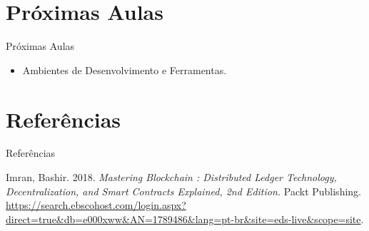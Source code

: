 \documentclass[
  pt-BR,
  ignorenonframetext,
]{beamer}
\providecommand{\tightlist}{%
  \setlength{\itemsep}{0pt}\setlength{\parskip}{0pt}}
\newlength{\cslhangindent}
\newenvironment{CSLReferences}[2] %
 {%
  \setlength{\parindent}{0pt}
  \ifodd #1 \everypar{\setlength{\hangindent}{\cslhangindent}}\ignorespaces\fi
  \ifnum #2 > 0
  \setlength{\parskip}{#2\baselineskip}
  \fi
 }%
 {}
\begin{document}
\hypertarget{pruxf3ximas-aulas}{%
\section{Próximas Aulas}\label{pruxf3ximas-aulas}}

\begin{frame}{Próximas Aulas}
\protect\hypertarget{pruxf3ximas-aulas-1}{}
\begin{itemize}
\tightlist
\item
  Ambientes de Desenvolvimento e Ferramentas.
\end{itemize}
\end{frame}

\hypertarget{referuxeancias}{%
\section{Referências}\label{referuxeancias}}

\begin{frame}{Referências}
\protect\hypertarget{referuxeancias-1}{}
\normalsize

\hypertarget{refs}{}
\begin{CSLReferences}{1}{0}
\leavevmode{}%
Imran, Bashir. 2018. \emph{Mastering Blockchain : Distributed Ledger
Technology, Decentralization, and Smart Contracts Explained, 2nd
Edition.} Packt Publishing.
\url{https://search.ebscohost.com/login.aspx?direct=true\&db=e000xww\&AN=1789486\&lang=pt-br\&site=eds-live\&scope=site}.

\end{CSLReferences}
\end{frame}
\end{document}
